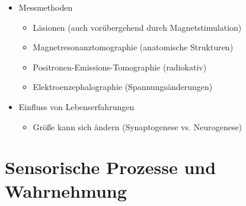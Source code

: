 \documentclass[11pt, paper=a4, twocolumn]{scrartcl}
\begin{document}
\begin{itemize}
		\item Messmethoden
			\begin{itemize}
				\item Läsionen (auch vorübergehend durch 
					Magnetstimulation)
				\item Magnetresonanztomographie (anatomische Strukturen)
				\item Positronen-Emissions-Tomographie (radiokativ)
				\item Elektroenzephalographie (Spannungsänderungen)
			\end{itemize}

		\item Einfluss von Lebenserfahrungen
			\begin{itemize}
				\item Größe kann sich ändern (Synaptogenese vs. 
					Neurogenese)
			\end{itemize}

	\end{itemize}

	\section{Sensorische Prozesse und Wahrnehmung}
\end{document}
